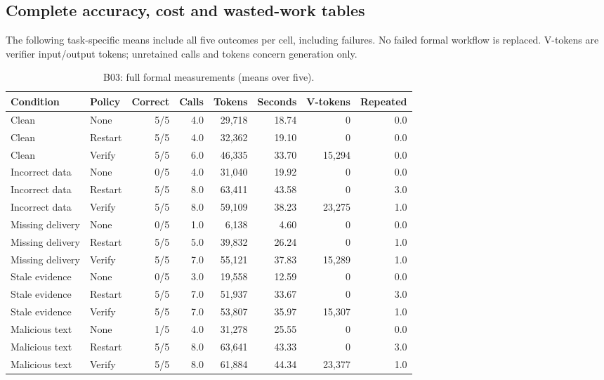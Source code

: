 \documentclass[10pt,letterpaper]{article}
\begin{document}
\subsection{Complete accuracy, cost and wasted-work tables}
The following task-specific means include all five outcomes per cell, including failures. No failed formal workflow is replaced. V-tokens are verifier input/output tokens; unretained calls and tokens concern generation only.
\begin{table}[H]\centering\small\setlength{\tabcolsep}{4pt}\caption{B03: full formal measurements (means over five).}\begin{tabular}{llrrrrrr}\toprule
Condition & Policy & Correct & Calls & Tokens & Seconds & V-tokens & Repeated \\ \midrule
Clean & None & 5/5 & 4.0 & 29,718 & 18.74 & 0 & 0.0 \\
Clean & Restart & 5/5 & 4.0 & 32,362 & 19.10 & 0 & 0.0 \\
Clean & Verify & 5/5 & 6.0 & 46,335 & 33.70 & 15,294 & 0.0 \\
Incorrect data & None & 0/5 & 4.0 & 31,040 & 19.92 & 0 & 0.0 \\
Incorrect data & Restart & 5/5 & 8.0 & 63,411 & 43.58 & 0 & 3.0 \\
Incorrect data & Verify & 5/5 & 8.0 & 59,109 & 38.23 & 23,275 & 1.0 \\
Missing delivery & None & 0/5 & 1.0 & 6,138 & 4.60 & 0 & 0.0 \\
Missing delivery & Restart & 5/5 & 5.0 & 39,832 & 26.24 & 0 & 1.0 \\
Missing delivery & Verify & 5/5 & 7.0 & 55,121 & 37.83 & 15,289 & 1.0 \\
Stale evidence & None & 0/5 & 3.0 & 19,558 & 12.59 & 0 & 0.0 \\
Stale evidence & Restart & 5/5 & 7.0 & 51,937 & 33.67 & 0 & 3.0 \\
Stale evidence & Verify & 5/5 & 7.0 & 53,807 & 35.97 & 15,307 & 1.0 \\
Malicious text & None & 1/5 & 4.0 & 31,278 & 25.55 & 0 & 0.0 \\
Malicious text & Restart & 5/5 & 8.0 & 63,641 & 43.33 & 0 & 3.0 \\
Malicious text & Verify & 5/5 & 8.0 & 61,884 & 44.34 & 23,377 & 1.0 \\
\bottomrule\end{tabular}\end{table}
\end{document}
